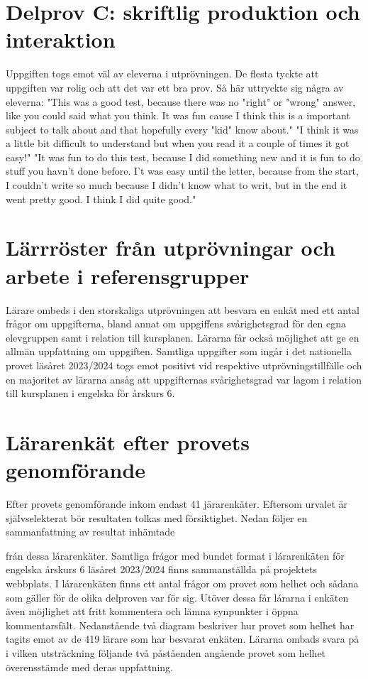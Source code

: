 \section*{Delprov C: skriftlig produktion och interaktion}
Uppgiften togs emot väl av eleverna i utprövningen. De flesta tyckte att uppgiften var rolig och att det var ett bra prov. Så här uttryckte sig några av eleverna:
"This was a good test, because there was no "right" or "wrong" answer, like you could said what you think. It was fun cause I think this is a important subject to talk about and that hopefully every "kid" know about."
"I think it was a little bit difficult to understand but when you read it a couple of times it got easy!"
"It was fun to do this test, because I did something new and it is fun to do stuff you havn't done before. I't was easy until the letter, because from the start, I couldn't write so much because I didn't know what to writ, but in the end it went pretty good. I think I did quite good."
\section*{Lärrröster från utprövningar och arbete i referensgrupper}
Lärare ombeds i den storskaliga utprövningen att besvara en enkät med ett antal frågor om uppgifterna, bland annat om uppgiffens svårighetsgrad för den egna elevgruppen samt i relation till kursplanen. Lärarna får också möjlighet att ge en allmän uppfattning om uppgiften. Samtliga uppgifter som ingår i det nationella provet läsåret 2023/2024 togs emot positivt vid respektive utprövningstillfälle och en majoritet av lärarna ansåg att uppgifternas svårighetsgrad var lagom i relation till kursplanen i engelska för årskurs 6.
\section*{Lärarenkät efter provets genomförande}
Efter provets genomförande inkom endast 41 järarenkäter. Eftersom urvalet är självselekterat bör resultaten tolkas med försiktighet. Nedan följer en sammanfattning av resultat inhämtade

frán dessa lárarenkäter. Samtliga frágor med bundet format i lárarenkäten för engelska årskurs 6 läsåret 2023/2024 finns sammanställda på projektets webbplats.
I lárarenkäten finns ett antal frågor om provet som helhet och sådana som gäller för de olika delproven var för sig. Utöver dessa får lárarna i enkäten även möjlighet att fritt kommentera och lämna synpunkter i öppna kommentarsfält. Nedanstående två diagram beskriver hur provet som helhet har tagits emot av de 419 lärare som har besvarat enkäten. Lärarna ombads svara på i vilken utsträckning följande två påståenden angående provet som helhet överensstämde med deras uppfattning.

